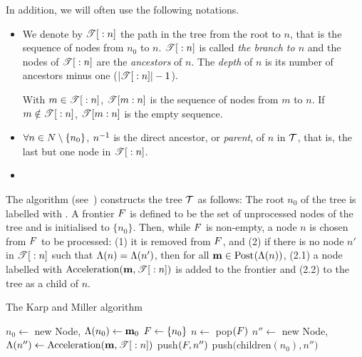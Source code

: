 In addition, we will often use the following notations.
\begin{itemize}
  \item We denote by $\treepath{n}$ the path in the tree from the root to $n$, that is the sequence of nodes from $n_0$ to $n$.
    $\treepath{n}$ is called \emph{the branch to $n$} and the nodes of $\treepath{n}$ are the \emph{ancestors} of $n$.
		The \emph{depth} of $n$ is its number of ancestors minus one ($|\treepath{n}| - 1$).

    With $m \in \treepath{n}$, $\treepath[m]{n}$ is the sequence of nodes from $m$ to $n$.
    If $m \notin \treepath{n}$, $\treepath[m]{n}$ is the empty sequence.
  \item $\forall n \in \nodes \setminus \{n_0\}$, $\parent{n}$ is the direct ancestor, or \emph{parent}, of $n$ in $\nameT$, that is, the last but one node in $\treepath{n}$.
  \item {}
\end{itemize}

The algorithm (see~) constructs the tree $\nameT$ as follows:
The root $n_0$ of the tree is labelled with \mari.
A frontier $\front$ is defined to be the set of unprocessed nodes of the tree and is initialised to $\{n_0\}$.
Then, while $\front$ is non-empty, a node $n$ is chosen from $\front$ to be processed:
(1) it is removed from $\front$, and (2) if there is no node $n'$ in $\treepath{n}$ such that $\lab{n} = \lab{n'}$, then for all \omark $\mar \in \post{\lab{n}}$, (2.1) a node labelled with $\kmacc{\mar, \treepath{n}}$ is added to the frontier and (2.2) to the tree as a child of $n$.

\begin{algorithm}
  \caption{The Karp and Miller algorithm}
  \label{algo:km}

  \begin{algorithmic}
    \State $n_0 \gets $ new Node, $\lab{n_0} \gets \mar_0$
    \State $\front \gets \{n_0\}$
    \While{$\front \neq \emptyset$}
      \State $n \gets$ pop$(\front)$ 
       
          \State $n'' \gets $ new Node, $\lab{n''} \gets \kmacc{\mar, \treepath{n}}$
          \State push$(\front, n'')$ 
          \State push$($children$(n_0), n'')$ 
        \EndFor
      \EndIf
    \EndWhile
  \end{algorithmic}
\end{algorithm}


